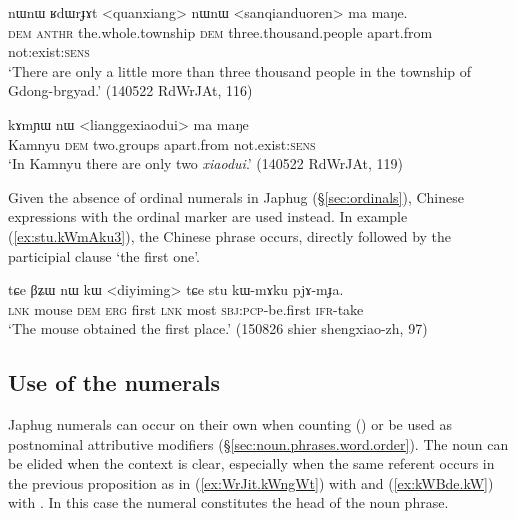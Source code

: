 \begin{exe}
\ex \label{ex:quanxiang}
\gll nɯnɯ ʁdɯrɟɤt <quanxiang> nɯnɯ <sanqianduoren> ma maŋe. \\
 \textsc{dem}  \textsc{anthr} the.whole.township \textsc{dem} three.thousand.people apart.from not:exist:\textsc{sens} \\
\glt  `There are only a little more than three thousand people in the township of Gdong-brgyad.' (140522 RdWrJAt, 116)
\end{exe}
 
\begin{exe}
\ex \label{ex:liangge}
\gll  kɤmɲɯ nɯ <lianggexiaodui> ma maŋe \\
 Kamnyu \textsc{dem} two.groups apart.from not.exist:\textsc{sens} \\
\glt `In Kamnyu there are only two \textit{xiaodui}.' (140522 RdWrJAt, 119)
\end{exe} 


Given the absence of ordinal numerals in Japhug (§\ref{sec:ordinals}), Chinese expressions with the ordinal marker   are used instead. In example (\ref{ex:stu.kWmAku3}), the Chinese phrase  occurs, directly followed by the participial clause  `the first one'.

\begin{exe}
	\ex  \label{ex:stu.kWmAku3}
	\gll tɕe βʑɯ nɯ kɯ <diyiming> tɕe stu kɯ-mɤku pjɤ-mɟa. \\
	\textsc{lnk} mouse \textsc{dem} \textsc{erg} first \textsc{lnk} most \textsc{sbj}:\textsc{pcp}-be.first \textsc{ifr}-take \\
	\glt `The mouse obtained the first place.' (150826 shier shengxiao-zh, 97)
\end{exe}

 \subsection{Use of the numerals}  \label{sec:uses.numerals}
 Japhug numerals can occur on their own when counting () or be used as postnominal attributive modifiers (§\ref{sec:noun.phrases.word.order}). The noun can be elided when the context is clear, especially when the same referent occurs in the previous proposition as in (\ref{ex:WrJit.kWngWt})  with  and (\ref{ex:kWBde.kW}) with . In this case the numeral constitutes the head of the noun phrase.


